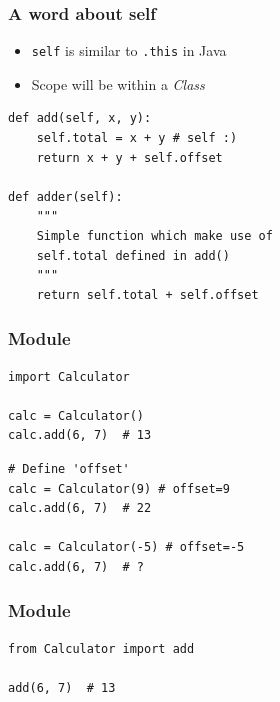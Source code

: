 \documentclass[bigger, presentation]{beamer}
\begin{document}
\begin{frame}[fragile]
\frametitle{A word about \textbf{self}}
\label{sec-3-5}


\begin{itemize}
\item \texttt{self} is similar to \texttt{.this} in Java
\item Scope will be within a \emph{Class}
\end{itemize}



\begin{verbatim}
def add(self, x, y):
    self.total = x + y # self :)
    return x + y + self.offset

def adder(self):
    """
    Simple function which make use of
    self.total defined in add()
    """
    return self.total + self.offset
\end{verbatim}
\end{frame}
\begin{frame}[fragile]
\frametitle{Module}
\label{sec-3-6}



\begin{verbatim}
import Calculator

calc = Calculator()
calc.add(6, 7)  # 13
\end{verbatim}


\begin{verbatim}
# Define 'offset'
calc = Calculator(9) # offset=9
calc.add(6, 7)  # 22

calc = Calculator(-5) # offset=-5
calc.add(6, 7)  # ?
\end{verbatim}
\end{frame}
\begin{frame}[fragile]
\frametitle{Module}
\label{sec-3-7}



\begin{verbatim}
from Calculator import add

add(6, 7)  # 13
\end{verbatim}
\end{frame}
\end{document}
